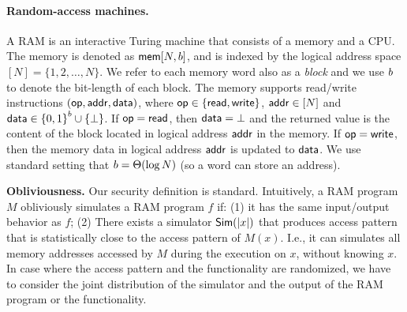 \paragraph{Random-access machines.}
A RAM is an interactive Turing machine that consists of a memory and a CPU.  The
memory is denoted as ${\mathsf{mem}}[{N},{b}]$, and is indexed by the logical
address space $[N] = \{1,2,\ldots,N\}$. We refer to each memory word also as a
\emph{block} and we use $b$ to denote the bit-length of each block. The memory supports read/write
instructions $(\mathsf{op},{\mathsf{addr}}, {\mathsf{data}})$, where $\mathsf{op} \in \{{\mathsf{read}},{\mathsf{write}}\}$, ${\mathsf{addr}} \in
[N]$ and ${\mathsf{data}} \in {\{0,1\}}^{b} \cup \{\bot\}$.  If $\mathsf{op} = {\mathsf{read}}$, then
${\mathsf{data}}=\bot$ and the returned value is the content of the block located in
logical address ${\mathsf{addr}}$ in the memory. If $\mathsf{op}={\mathsf{write}}$, then the memory data in
logical address ${\mathsf{addr}}$ is updated to ${\mathsf{data}}$.
We use standard setting that ${b} = \Theta(\log N)$ (so a word can 
store an address).

\medskip
\noindent
{\bf Obliviousness.}
Our security definition is standard. Intuitively, a RAM program $M$ obliviously simulates a RAM program $f$ if: (1) it has the same input/output behavior as $f$; (2) There exists a simulator ${\sf Sim}(\lvert x\rvert)$ that produces access pattern that is statistically close to the access pattern of $M(x)$. I.e., it can simulates all memory addresses accessed by $M$ during the execution on $x$, without knowing $x$. In case where the access pattern and the functionality are randomized, we have to consider the joint distribution of the simulator and the output of the RAM program or the functionality. 


